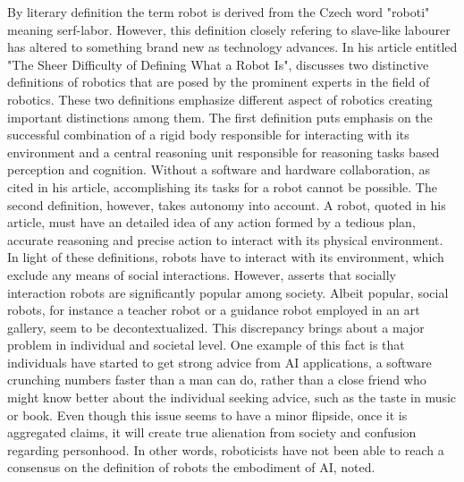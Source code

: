 \documentclass[man]{apa6}
\begin{document}
By literary definition the term robot is derived from the Czech word "roboti" meaning serf-labor. However, this definition closely refering to slave-like labourer has altered to something brand new as technology advances. In his article entitled "The Sheer Difficulty of Defining What a Robot Is",  discusses two distinctive definitions of robotics that are posed by the prominent experts in the field of robotics. These two definitions emphasize different aspect of robotics creating important distinctions among them. The first definition puts emphasis on the successful combination of a rigid body responsible for interacting with its environment and a central reasoning unit responsible for reasoning tasks based perception and cognition. Without a software and hardware collaboration, as  cited in his article, accomplishing its tasks for a robot cannot be possible.
The second definition, however, takes autonomy into account. A robot,  quoted in his article, must have an detailed idea of any action formed by a tedious plan, accurate reasoning and precise action to interact with its physical environment. In light of these definitions, robots have to interact with its environment, which exclude any means of social interactions. However,  asserts that socially interaction robots are significantly popular among society. Albeit popular, social robots, for instance a teacher robot or a guidance robot employed in an art gallery, seem to be decontextualized. This discrepancy brings about a major problem in individual and societal level. One example of this fact is that individuals have started to get strong advice from AI applications, a software crunching numbers faster than a man can do, rather than a close friend who might know better about the individual seeking advice, such as the taste in music or book. Even though this issue seems to have a minor flipside, once it is aggregated  claims, it will create true alienation from society and confusion regarding personhood. In other words, roboticists have not been able  to reach a consensus on the definition of robots the embodiment of AI,  noted.\par
\end{document}
